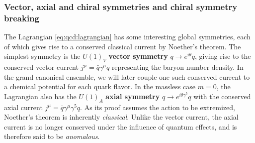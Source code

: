 \subsubsection{Vector, axial and chiral symmetries and chiral symmetry breaking}

The Lagrangian \eqref{eq:qcd:lagrangian} has some interesting global symmetries, each of which gives rise to a conserved classical current by Noether's theorem.
The simplest symmetry is the $U(1)_V$ \textbf{vector symmetry} $q \rightarrow e^{i \theta} q$, giving rise to the conserved vector current $j^\mu = \bar{q} \gamma^\mu q$ representing the baryon number density.
In the grand canonical ensemble, we will later couple one such conserved current to a chemical potential for each quark flavor.
In the massless case $m = 0$, the Lagrangian also has the $U(1)_A$ \textbf{axial symmetry} $q \rightarrow e^{i \theta \gamma^5} q$ with the conserved axial current $j^\mu = \bar{q} \gamma^\mu \gamma^5 q$.
As its proof assumes the action to be extremized, Noether's theorem is inherently \emph{classical}.
Unlike the vector current, the axial current is no longer conserved under the influence of quantum effects, and is therefore said to be \emph{anomalous}.

